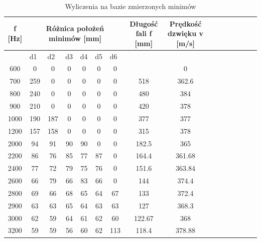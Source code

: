 \documentclass{article}
\begin{document}
\begin{table}[h!tbp]
\begin{center}
\centering
\begin{tabular}{|c|c|c|c|c|c|c|c|c|c|c|c|c|c|c|c|}
\hline
\multicolumn{1}{|c|}{f [Hz]} & \multicolumn{ 6}{c|}{Różnica położeń minimów [mm]} & \multicolumn{1}{c|}{Długość fali f [mm]} & \multicolumn{1}{c|}{Prędkość dzwięku v [m/s]} \\ \hline
\multicolumn{1}{|l|}{} & \multicolumn{1}{l|}{d1} & \multicolumn{1}{l|}{d2} & \multicolumn{1}{l|}{d3} & \multicolumn{1}{l|}{d4} & \multicolumn{1}{l|}{d5} & \multicolumn{1}{l|}{d6} & \multicolumn{1}{l|}{} & \multicolumn{1}{l|}{} \\ \hline
600 & 0 & 0 & 0 & 0 & 0 & 0 & \multicolumn{1}{l|}{} & 0 \\ \hline
700 & 259 & 0 & 0 & 0 & 0 & 0 & 518 & 362.6 \\ \hline
800 & 240 & 0 & 0 & 0 & 0 & 0 & 480 & 384 \\ \hline
900 & 210 & 0 & 0 & 0 & 0 & 0 & 420 & 378 \\ \hline
1000 & 190 & 187 & 0 & 0 & 0 & 0 & 377 & 377 \\ \hline
1200 & 157 & 158 & 0 & 0 & 0 & 0 & 315 & 378 \\ \hline
2000 & 94 & 91 & 90 & 90 & 0 & 0 & 182.5 & 365 \\ \hline
2200 & 86 & 76 & 85 & 77 & 87 & 0 & 164.4 & 361.68 \\ \hline
2400 & 77 & 72 & 79 & 75 & 76 & 0 & 151.6 & 363.84 \\ \hline
2600 & 66 & 79 & 66 & 83 & 66 & 0 & 144 & 374.4 \\ \hline
2800 & 69 & 66 & 68 & 65 & 64 & 67 & 133 & 372.4 \\ \hline
2900 & 63 & 63 & 65 & 64 & 63 & 63 & 127 & 368.3 \\ \hline
3000 & 62 & 59 & 64 & 61 & 62 & 60 & 122.67 & 368 \\ \hline
3200 & 59 & 59 & 56 & 60 & 62 & 113 & 118.4 & 378.88 \\ \hline
\end{tabular}
\end{center}
\label{}
\caption{Wyliczenia na bazie zmierzonych minimów}
\end{table}



\end{document}
